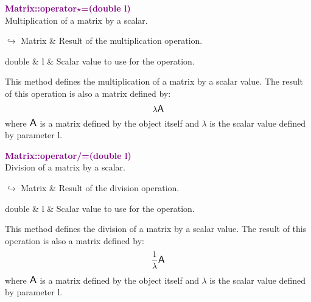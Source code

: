 \textcolor{purple}{\textbf{Matrix::operator$\star$=(double l)}}\label{Matrix::operator*=(double l)}\\
Multiplication of a matrix by a scalar.\vspace*{-0.5em}
\begin{tcolorbox}[grow to left by=-1cm, width=\textwidth-1cm,myArgs,tabularx={l|R}]
$\hookrightarrow$ Matrix & Result of the multiplication operation.
\end{tcolorbox}

\begin{tcolorbox}[width=\textwidth,myArgs,tabularx={ll|R}]
double & l & Scalar value to use for the operation.
\end{tcolorbox}

This method defines the multiplication of a matrix by a scalar value.
The result of this operation is also a matrix defined by:
\begin{equation*}
\lambda \mbox{\large\ensuremath{\mathsf{A}}}
\end{equation*}
where $\mbox{\large\ensuremath{\mathsf{A}}}$ is a matrix defined by the object itself and $\lambda$ is the scalar value defined by parameter l.

\textcolor{purple}{\textbf{Matrix::operator/=(double l)}}\label{Matrix::operator/=(double l)}\\
Division of a matrix by a scalar.\vspace*{-0.5em}
\begin{tcolorbox}[grow to left by=-1cm, width=\textwidth-1cm,myArgs,tabularx={l|R}]
$\hookrightarrow$ Matrix & Result of the division operation.
\end{tcolorbox}

\begin{tcolorbox}[width=\textwidth,myArgs,tabularx={ll|R}]
double & l & Scalar value to use for the operation.
\end{tcolorbox}

This method defines the division of a matrix by a scalar value.
The result of this operation is also a matrix defined by:
\begin{equation*}
\frac{1}{\lambda} \mbox{\large\ensuremath{\mathsf{A}}}
\end{equation*}
where $\mbox{\large\ensuremath{\mathsf{A}}}$ is a matrix defined by the object itself and $\lambda$ is the scalar value defined by parameter l.

